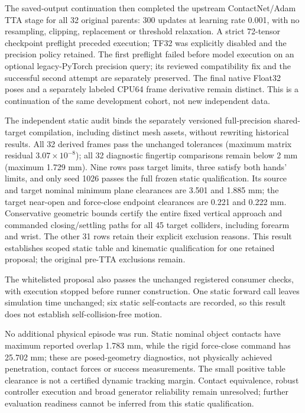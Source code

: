 \documentclass[10pt,letterpaper]{article}
\begin{document}
The saved-output continuation then completed the upstream ContactNet/Adam TTA
stage for all 32 original parents: 300 updates at learning rate 0.001, with no
resampling, clipping, replacement or threshold relaxation. A strict 72-tensor
checkpoint preflight preceded execution; TF32 was explicitly disabled and the
precision policy retained. The first preflight failed before model execution
on an optional legacy-PyTorch precision query; its reviewed compatibility fix
and the successful second attempt are separately preserved. The final native
Float32 poses and a separately labeled CPU64 frame derivative remain distinct.
This is a continuation of the same development cohort, not new independent data.

The independent static audit binds the separately versioned full-precision
shared-target compilation, including distinct mesh assets, without rewriting
historical results. All 32 derived frames pass the unchanged tolerances
(maximum matrix residual $3.07\times10^{-8}$); all 32 diagnostic fingertip
comparisons remain below 2 mm (maximum 1.729 mm). Nine rows pass target limits,
three satisfy both hands' limits, and only seed 1026 passes the full frozen
static qualification. Its source and target nominal minimum plane clearances
are 3.501 and 1.885 mm; the target near-open and force-close endpoint clearances
are 0.221 and 0.222 mm. Conservative geometric bounds certify the entire fixed
vertical approach and commanded closing/settling paths for all 45 target
colliders, including forearm and wrist. The other 31 rows retain their explicit
exclusion reasons. This result establishes scoped static table and kinematic
qualification for one retained proposal; the original pre-TTA exclusions remain.

The whitelisted proposal also passes the unchanged registered consumer
checks, with execution stopped before runner construction. One static forward
call leaves simulation time unchanged; six static self-contacts are recorded,
so this result does not establish self-collision-free motion.

No additional physical episode was run. Static nominal object contacts have
maximum reported overlap 1.783 mm, while the rigid force-close command has
25.702 mm; these are posed-geometry diagnostics, not physically achieved
penetration, contact forces or success measurements. The small positive table
clearance is not a certified dynamic tracking margin. Contact equivalence,
robust controller execution and broad generator reliability remain unresolved;
further evaluation readiness cannot be inferred from this static qualification.
\end{document}

